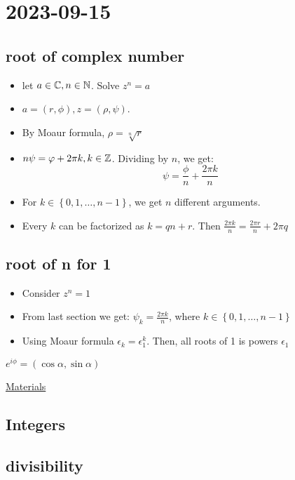 \section{2023-09-15}

\subsection{root of complex number}

\begin{itemize}
	\item let $a \in \mathbb{C}, n \in \mathbb{N}$. Solve $z^{n} = a$ 
	\item $a = (r, \phi), z = (\rho, \psi)$.
	\item By Moaur formula, $\rho = \sqrt[n]{r}$ 
	\item $n\psi =\varphi + 2\pi k, k \in \mathbb{Z}$. Dividing by $n$, we get:
		\[
			\psi = \frac{\phi}{n} + \frac{2\pi k}{n}
		\]
	\item For $k \in \left\{ 0,1, \dots , n-1 \right \} $, we get $n$ different arguments.
	\item Every $k$ can be factorized as $k = qn + r$. Then  $\frac{2\pi k}{n} = \frac{2\pi r}{n} + 2\pi q$ 
\end{itemize}

\subsection{root of n for 1}

\begin{itemize}
	\item Consider $z^{n} = 1$
	\item From last section we get: $\psi_k = \frac{2\pi k}{n}$, where $k \in \left\{ 0,1, \dots , n-1 \right \} $ 
	\item Using Moaur formula $\epsilon_k = \epsilon_1^k$. Then, all roots of 1 is powers  $\epsilon_1$ 
\end{itemize}

\begin{note}[]
	$e ^{i\phi} = (\cos \alpha, \sin \alpha)$
\end{note}

\href{http://logic.pdmi.ras.ru/~dvk/ITMO/Algebra}{Materials} 

\subsection{Integers}

\subsection{divisibility}

